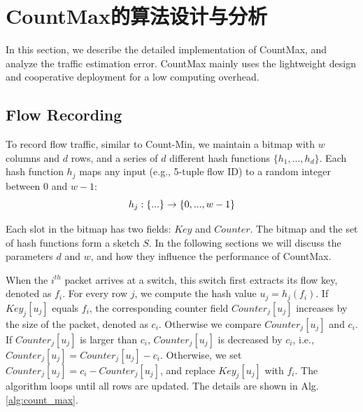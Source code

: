 \chapter{CountMax的算法设计与分析}
In this section, we describe the detailed implementation of CountMax, and analyze the traffic estimation error. CountMax mainly uses the lightweight design and cooperative deployment for a low computing overhead.


\section{Flow Recording}

To record flow traffic, similar to Count-Min, we maintain a bitmap with $w$ columns and $d$ rows, and a series of $d$ different hash functions $\{h_{1},...,h_{d}\}$. Each hash function $h_j$ maps any input (e.g., 5-tuple flow ID) to a random integer between $0$ and $w-1$:
\begin{equation}
\notag h_j: \{...\} \to \{0, ..., w-1\}
\end{equation}

Each slot in the bitmap has two fields: $Key$ and $Counter$. The bitmap and the set of hash functions form a sketch $S$. In the following sections we will discuss the parameters $d$ and $w$, and how they influence the performance of CountMax.%


When the $i^{th}$ packet arrives at a switch, this switch first extracts its flow key, denoted as $f_i$. For every row $j$, we compute the hash value $u_{j}=h_{j}(f_i)$. If $Key_{j}[u_{j}]$ equals $f_i$, the corresponding counter field $Counter_{j}[u_{j}]$ increases by the size of the packet, denoted as $c_i$. Otherwise we compare $Counter_{j}[u_{j}]$ and $c_i$. If $Counter_{j}[u_{j}]$ is larger than $c_i$, $Counter_{j}[u_{j}]$ is decreased by $c_i$, i.e., $Counter_{j}[u_{j}] = Counter_{j}[u_{j}] - c_i$. Otherwise, we set $Counter_{j}[u_{j}]=c_i - Counter_{j}[u_{j}]$, and replace $Key_{j}[u_{j}]$ with $f_i$. The algorithm loops until all rows are updated. The details are shown in Alg. \ref{alg:count_max}.

